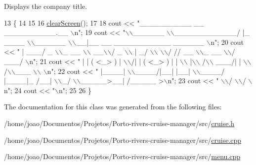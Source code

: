 Displays the company title. 
\begin{DoxyCode}
13                      \{
14 
15 
16     \hyperlink{menu_8h_aceb70c1ed7e11f0863a868704f02214b}{clearScreen}();
17 
18     cout << \textcolor{stringliteral}{"\_\_\_\_\_\_\_\_\_\_              \_\_           \_\_\_\_\_\_\_\_\_\_.\_\_                               \(\backslash\)n"};
19     cout << \textcolor{stringliteral}{"\(\backslash\)\(\backslash\)\_\_\_\_\_\_   \(\backslash\)\(\backslash\)\_\_\_\_\_\_\_\_\_\_\_\_/  |\_  \_\_\_\_   \(\backslash\)\(\backslash\)\_\_\_\_\_\_   \(\backslash\)\(\backslash\)\_\_|\_\_  \_\_ \_\_\_\_\_\_\_\_\_\_\_  \_\_\_\_\_\_      \(\backslash\)n"};
20     cout << \textcolor{stringliteral}{" |     \_\_\_/  \_ \(\backslash\)\(\backslash\)\_  \_\_ \(\backslash\)\(\backslash\)   \_\_\(\backslash\)\(\backslash\)/  \_ \(\backslash\)\(\backslash\)   |       \_/  \(\backslash\)\(\backslash\)  \(\backslash\)\(\backslash\)/ // \_\_ \(\backslash\)\(\backslash\)\_  \_\_ \(\backslash\)\(\backslash\)/  \_\_\_/    \(\backslash\)n"};
21     cout << \textcolor{stringliteral}{" |    |  (  <\_> )  | \(\backslash\)\(\backslash\)/|  | (  <\_> )  |    |   \(\backslash\)\(\backslash\)  |\(\backslash\)\(\backslash\)   /\(\backslash\)\(\backslash\)  \_\_\_/|  | \(\backslash\)\(\backslash\)/\(\backslash\)\(\backslash\)\_\_\_ \(\backslash\)\(\backslash\)   \(\backslash\)n"};
22     cout << \textcolor{stringliteral}{" |\_\_\_\_|   \(\backslash\)\(\backslash\)\_\_\_\_/|\_\_|   |\_\_|  \(\backslash\)\(\backslash\)\_\_\_\_/   |\_\_\_\_|\_  /\_\_| \(\backslash\)\(\backslash\)\_/  \(\backslash\)\(\backslash\)\_\_\_\_\_>\_\_|  /\_\_\_\_\_ >\(\backslash\)n"};
23     cout << \textcolor{stringliteral}{"                                             \(\backslash\)\(\backslash\)/                            \(\backslash\)\(\backslash\)/       \(\backslash\)n"};
24     cout << \textcolor{stringliteral}{"\(\backslash\)n"};
25 
26 \}
\end{DoxyCode}


The documentation for this class was generated from the following files\+:\begin{DoxyCompactItemize}
\item 
/home/joao/\+Documentos/\+Projetos/\+Porto-\/rivers-\/cruise-\/manager/src/\hyperlink{cruise_8h}{cruise.\+h}\item 
/home/joao/\+Documentos/\+Projetos/\+Porto-\/rivers-\/cruise-\/manager/src/\hyperlink{cruise_8cpp}{cruise.\+cpp}\item 
/home/joao/\+Documentos/\+Projetos/\+Porto-\/rivers-\/cruise-\/manager/src/\hyperlink{menu_8cpp}{menu.\+cpp}\end{DoxyCompactItemize}
